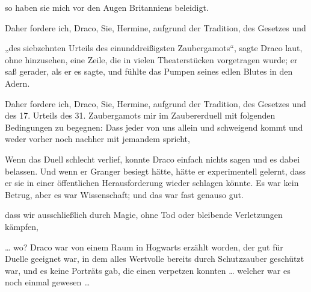 \begin{writtenNote}
so haben sie mich vor den Augen Britanniens beleidigt.

Daher fordere ich, Draco, Sie, Hermine, aufgrund der Tradition, des Gesetzes und
\end{writtenNote}

„des siebzehnten Urteils des einunddreißigsten Zaubergamots“, sagte Draco laut, ohne hinzusehen, eine Zeile, die in vielen Theaterstücken vorgetragen wurde; er saß gerader, als er es sagte, und fühlte das Pumpen seines edlen Blutes in den Adern.

\begin{writtenNote}
Daher fordere ich, Draco, Sie, Hermine, aufgrund der Tradition, des Gesetzes und des 17. Urteils des 31. Zaubergamots mir im Zaubererduell mit folgenden Bedingungen zu begegnen: Dass jeder von uns allein und schweigend kommt und weder vorher noch nachher mit jemandem spricht,
\end{writtenNote}

Wenn das Duell schlecht verlief, konnte Draco einfach nichts sagen und es dabei belassen. Und wenn er Granger besiegt hätte, hätte er experimentell gelernt, dass er sie in einer öffentlichen Herausforderung wieder schlagen könnte. Es war kein Betrug, aber es war Wissenschaft; und das war fast genauso gut.

\begin{writtenNote}
dass wir ausschließlich durch Magie, ohne Tod oder bleibende Verletzungen kämpfen,
\end{writtenNote}

… wo? Draco war von einem Raum in Hogwarts erzählt worden, der gut für Duelle geeignet war, in dem alles Wertvolle bereits durch Schutzzauber geschützt war, und es keine Porträts gab, die einen verpetzen konnten … welcher war es noch einmal gewesen …

